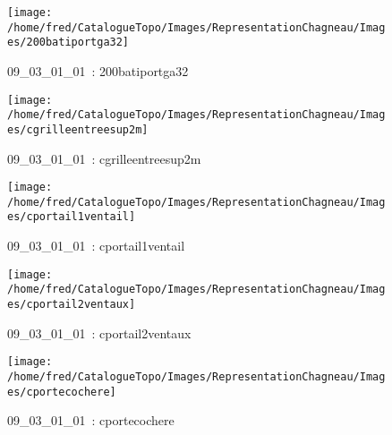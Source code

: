 \documentclass[12pt,titlepage]{book}
\begin{document}
\begin{figure}[h!]
  \hfill         %
  \begin{minipage}[t]{3cm}
    \begin{center}
      \texttt{[image: /home/fred/CatalogueTopo/Images/RepresentationChagneau/Images/200batiportga32]}
      \caption[~09\_03\_01\_01]{\small{09\_03\_01\_01~:} \tiny{200batiportga32}}\label{200batiportga32}
    \end{center}
  \end{minipage}
  \begin{minipage}[t]{3cm}
    \begin{center}
      \texttt{[image: /home/fred/CatalogueTopo/Images/RepresentationChagneau/Images/cgrilleentreesup2m]}
      \caption[~09\_03\_01\_01]{\small{09\_03\_01\_01~:} \tiny{cgrilleentreesup2m}}\label{cgrilleentreesup2m}
    \end{center}
  \end{minipage}
  \begin{minipage}[t]{3cm}
    \begin{center}
      \texttt{[image: /home/fred/CatalogueTopo/Images/RepresentationChagneau/Images/cportail1ventail]}
      \caption[~09\_03\_01\_01]{\small{09\_03\_01\_01~:} \tiny{cportail1ventail}}\label{cportail1ventail}
    \end{center}
  \end{minipage}
  \begin{minipage}[t]{3cm}
    \begin{center}
      \texttt{[image: /home/fred/CatalogueTopo/Images/RepresentationChagneau/Images/cportail2ventaux]}
      \caption[~09\_03\_01\_01]{\small{09\_03\_01\_01~:} \tiny{cportail2ventaux}}\label{cportail2ventaux}
    \end{center}
  \end{minipage}
  \begin{minipage}[t]{3cm}
    \begin{center}
      \texttt{[image: /home/fred/CatalogueTopo/Images/RepresentationChagneau/Images/cportecochere]}
      \caption[~09\_03\_01\_01]{\small{09\_03\_01\_01~:} \tiny{cportecochere}}\label{cportecochere}
    \end{center}
  \end{minipage}

\end{figure}
\end{document}
